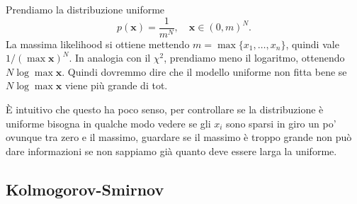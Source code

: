 \begin{example}
	Prendiamo la distribuzione uniforme
	\begin{equation*}
		p(\mathbf x) = \frac1{m^N},
		\quad \mathbf x \in (0,m)^N.
	\end{equation*}
	La massima likelihood si ottiene mettendo $m = \max\{x_1,\ldots,x_n\}$,
    quindi vale $1/(\max\mathbf x)^N$. In analogia con il $\chi^2$, prendiamo
    meno il logaritmo, ottenendo $N \log\max\mathbf x$. Quindi dovremmo
    dire che il modello uniforme non fitta bene se $N \log\max\mathbf x$ viene
    più grande di tot.
    
    È intuitivo che questo ha poco senso, per controllare se la distribuzione è
    uniforme bisogna in qualche modo vedere se gli $x_i$ sono sparsi in giro un
    po' ovunque tra zero e il massimo, guardare se il massimo è troppo grande
    non può dare informazioni se non sappiamo già quanto deve essere larga la
    uniforme.
\end{example}

\subsection{Kolmogorov-Smirnov}

